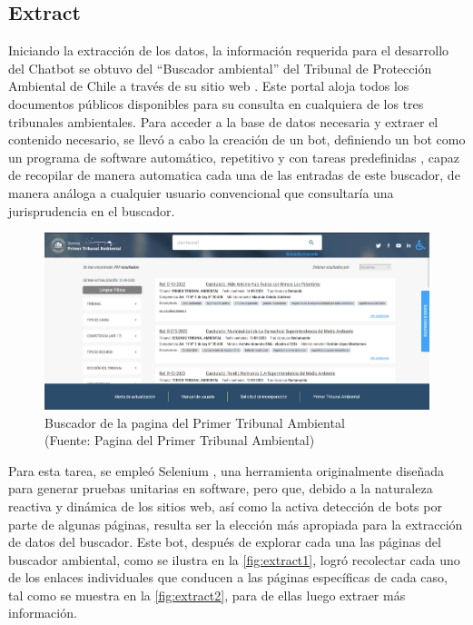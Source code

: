 \subsection{Extract}

Iniciando la extracción de los datos, la información requerida para el desarrollo del Chatbot se obtuvo del ``Buscador ambiental'' del Tribunal de Protección Ambiental 
de Chile a través de su sitio web \cite{BuscadorAmbiental}. Este portal aloja todos los documentos públicos disponibles para su consulta en cualquiera 
de los tres tribunales ambientales. Para acceder a la base de datos necesaria y extraer el contenido necesario, se llevó a cabo la creación de 
un bot, definiendo un bot como un programa de software automático, repetitivo y con tareas predefinidas \cite{Kaspersky_2023}, capaz de recopilar
de manera automatica cada una de las entradas de este buscador, de manera análoga a cualquier usuario convencional
que consultaría una jurisprudencia en el buscador.

\begin{figure}[ht!]
    \centering
    \includegraphics[width=.75\textwidth]{figures/huemul2.png}
    \caption[Screenshot del Buscador de la pagina del Primer Tribunal Ambiental]{Buscador de la pagina del Primer Tribunal Ambiental\\
    {\scriptsize (Fuente: Pagina del Primer Tribunal Ambiental)}}
    \label{fig:extract1}
\end{figure}
    
Para esta tarea, se empleó Selenium \cite{seleniumSelenium}, una herramienta originalmente diseñada para generar pruebas unitarias en software, pero que, debido a la naturaleza 
reactiva y dinámica de los sitios web, así como la activa detección de bots por parte de algunas páginas, resulta ser la elección 
más apropiada para la extracción de datos del buscador. Este bot, después de explorar cada una las páginas del buscador ambiental, como se ilustra en la \autoref{fig:extract1},
logró recolectar cada uno de los enlaces individuales que conducen a las páginas específicas de cada caso, tal como se 
muestra en la \autoref{fig:extract2}, para de ellas luego extraer más información.


